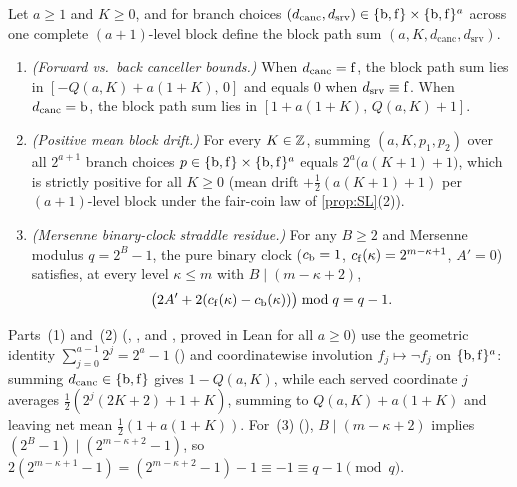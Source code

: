 \begin{proposition}\label{prop:OC}
Let $a \ge 1$ and $K \ge 0$, and for branch choices $(d_{\mathrm{canc}}, d_{\mathrm{srv}}) \in \{\mathrm{b}, \mathrm{f}\} \times
\{\mathrm{b}, \mathrm{f}\}^a$ across one complete $(a+1)$-level block define the block path sum $(a, K,
d_{\mathrm{canc}}, d_{\mathrm{srv}})$.
\begin{enumerate}
\item \emph{(Forward vs.\ back canceller bounds.)} When $d_{\mathrm{canc}} = \mathrm{f}$, the block path sum lies in
  $[-Q(a, K) + a(1 + K),\, 0]$ and equals $0$ when $d_{\mathrm{srv}} \equiv \mathrm{f}$. When $d_{\mathrm{canc}} = \mathrm{b}$, the
  block path sum lies in $[1 + a(1 + K),\, Q(a, K) + 1]$.
\item \emph{(Positive mean block drift.)} For every $K \in \mathbb{Z}$, summing $(a, K, p_1, p_2)$ over all
  $2^{a+1}$ branch choices $p \in \{\mathrm{b}, \mathrm{f}\} \times \{\mathrm{b}, \mathrm{f}\}^a$ equals $2^a\bigl(a(K + 1) + 1\bigr)$, which
  is strictly positive for all $K \ge 0$ (mean drift $+\tfrac{1}{2}(a(K+1) + 1)$ per $(a+1)$-level block under the fair-coin
  law of \cref{prop:SL}(2)).
\item \emph{(Mersenne binary-clock straddle residue.)} For any $B \ge 2$ and Mersenne modulus $q = 2^B - 1$, the pure
  binary clock ($c_{\mathrm{b}} = 1$, $c_{\mathrm{f}}(\kappa) = 2^{m - \kappa + 1}$, $A' = 0$) satisfies, at every level $\kappa \le m$
  with $B \mid (m - \kappa + 2)$,
  \[
    \bigl(2 A' + 2(c_{\mathrm{f}}(\kappa) - c_{\mathrm{b}}(\kappa))\bigr) \bmod q = q - 1.
  \]
\end{enumerate}
\end{proposition}

\begin{outline}
Parts~(1) and~(2) (, , and , proved in Lean for
all $a \ge 0$) use the geometric identity $\sum_{j=0}^{a-1} 2^j = 2^a - 1$ () and coordinatewise
involution $f_j \mapsto \neg f_j$ on $\{\mathrm{b}, \mathrm{f}\}^a$: summing $d_{\mathrm{canc}} \in \{\mathrm{b}, \mathrm{f}\}$ gives
$1 - Q(a, K)$, while each served coordinate $j$ averages $\tfrac{1}{2}(2^j(2K + 2) + 1 + K)$, summing to $Q(a, K) +
a(1 + K)$ and leaving net mean $\tfrac{1}{2}(1 + a(1 + K))$. For~(3) (), $B \mid (m -
\kappa + 2)$ implies $(2^B - 1) \mid (2^{m - \kappa + 2} - 1)$, so $2(2^{m - \kappa + 1} - 1) = (2^{m - \kappa + 2} - 1) -
1 \equiv -1 \equiv q - 1 \pmod q$.
\end{outline}

